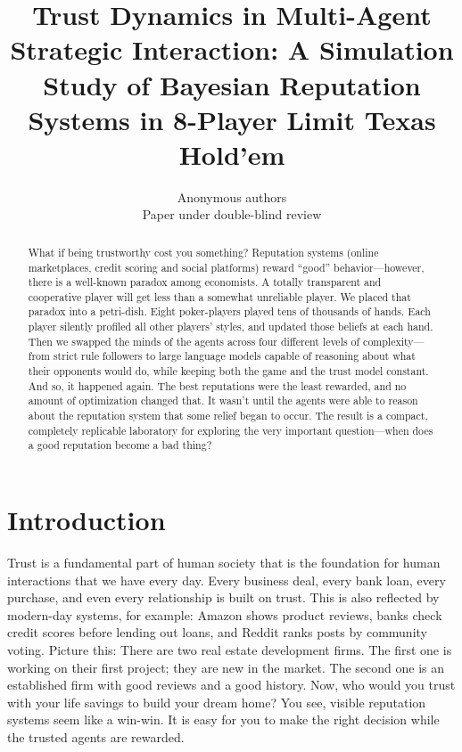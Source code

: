 \documentclass[10pt]{article} %
\title{Trust Dynamics in Multi-Agent Strategic Interaction:
  A Simulation Study of Bayesian Reputation Systems in
  8-Player Limit Texas Hold'em}
\author{Anonymous authors\\Paper under double-blind review}
\begin{document}
\maketitle

\begin{abstract}
      What if being trustworthy cost you something? Reputation
      systems (online marketplaces, credit scoring and social
      platforms) reward ``good'' behavior---however, there is a
      well-known paradox among economists. A totally transparent and
      cooperative player will get less than a somewhat unreliable
      player. We placed that paradox into a petri-dish. Eight
      poker-players played tens of thousands of hands. Each player
      silently profiled all other players' styles, and updated those
      beliefs at each hand. Then we swapped the minds of the agents
      across four different levels of complexity---from strict rule
      followers to large language models capable of reasoning about
      what their opponents would do, while keeping both the game and
      the trust model constant. And so, it happened again. The best
      reputations were the least rewarded, and no amount of
      optimization changed that. It wasn't until the agents were able
      to reason about the reputation system that some relief began to
      occur. The result is a compact, completely replicable
      laboratory for exploring the very important question---when
      does a good reputation become a bad thing?
\end{abstract}

\section{Introduction}

Trust is a fundamental part of human society that is the
foundation for human interactions that we have every day. Every
business deal, every bank loan, every purchase, and even every
relationship is built on trust. This is also reflected by
modern-day systems, for example: Amazon shows product reviews,
banks check credit scores before lending out loans, and Reddit
ranks posts by community voting. Picture this: There are two real
estate development firms. The first one is working on their first
project; they are new in the market. The second one is an
established firm with good reviews and a good history. Now, who
would you trust with your life savings to build your dream home?
You see, visible reputation systems seem like a win-win. It is
easy for you to make the right decision while the trusted agents
are rewarded.
\end{document}
